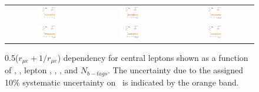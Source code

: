 \begin{figure}[htbp]
  \begin{center}
    \begin{tabular}{ccc}
      \includegraphics[width=0.25\textwidth]{bkgd/figs/rSFOFFromRMuE_ZPeakControlCentral_Run2015_25ns_NJets_None.pdf} & 
      \includegraphics[width=0.25\textwidth]{bkgd/figs/rSFOFFromRMuE_ZPeakControlCentral_Run2015_25ns_nVtx_None.pdf}  &
      \includegraphics[width=0.25\textwidth]{bkgd/figs/rSFOFFromRMuE_ZPeakControlCentral_Run2015_25ns_TrailingPt_None.pdf} \\
      \includegraphics[width=0.25\textwidth]{bkgd/figs/rSFOFFromRMuE_ZPeakControlCentral_Run2015_25ns_Mll_None.pdf} &
      \includegraphics[width=0.25\textwidth]{bkgd/figs/rSFOFFromRMuE_ZPeakControlCentral_Run2015_25ns_MET_None.pdf} &
      \includegraphics[width=0.25\textwidth]{bkgd/figs/rSFOFFromRMuE_ZPeakControlCentral_Run2015_25ns_NBJets_None.pdf} \\
    \end{tabular}
  \end{center}
  \caption{
    \label{fig:RDependencyCentral}
    0.5($r_{\mu e}+1/r_{\mu e}$) dependency for central leptons shown as a function of \nj, \nvtx, lepton \pt, \mll, \MET, and $N_{b-tags}$.
    The uncertainty due to the assigned 10\% systematic uncertainty on \rmue~is indicated by the orange band.
  }
\end{figure}


